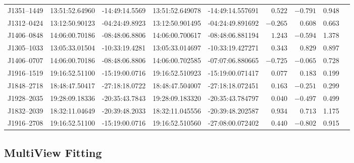 \begin{table}[h]
{\begin{tabular}{lccccrrrr}
					J1351--1449 &  13:51:52.64960 & -14:49:14.5569 & 13:51:52.649078 & -14:49:14.557691 & $ 0.522$ & $-0.791$ & 0.948 \\
					J1312--0424 &  13:12:50.90123 & -04:24:49.8923 & 13:12:50.901495 & -04:24:49.891692 & $-0.265$ & $ 0.608$ & 0.663 \\
					J1406--0848 &  14:06:00.70186 & -08:48:06.8806 & 14:06:00.700617 & -08:48:06.881194 & $ 1.243$ & $-0.594$ & 1.378 \\
					J1305--1033 &  13:05:33.01504 & -10:33:19.4281 & 13:05:33.014697 & -10:33:19.427271 & $ 0.343$ & $ 0.829$ & 0.897 \\
					J1406--0707 &  14:06:00.70186 & -08:48:06.8806 & 14:06:00.702585 & -07:07:06.880665 & $-0.725$ & $-0.065$ & 0.728 \\\hline
					J1916--1519 &  19:16:52.51100 & -15:19:00.0716 & 19:16:52.510923 & -15:19:00.071417 & $ 0.077$ & $ 0.183$ & 0.199 \\
					J1848--2718 &  18:48:47.50417 & -27:18:18.0722 & 18:48:47.504007 & -27:18:18.072451 & $ 0.163$ & $-0.251$ & 0.299 \\
					J1928--2035 &  19:28:09.18336 & -20:35:43.7843 & 19:28:09.183320 & -20:35:43.784797 & $ 0.040$ & $-0.497$ & 0.499 \\
					J1832--2039 &  18:32:11.04649 & -20:39:48.2033 & 18:32:11.045556 & -20:39:48.202587 & $ 0.934$ & $ 0.713$ & 1.175 \\
					J1916--2708 &  19:16:52.51100 & -15:19:00.0716 & 19:16:52.510560 & -27:08:00.072402 & $ 0.440$ & $-0.802$ & 0.915 \\\bottomrule
				\end{tabular}}\label{tab:multiview_positions}
			\end{table}
		
	\subsection{MultiView Fitting}
		
